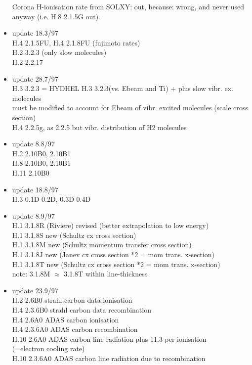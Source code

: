 \documentclass[12pt]{article}
\begin{document}
\begin{itemize}
   Corona H-ionisation rate from SOLXY: out, because:
   wrong, and never used anyway
(i.e. H.8 2.1.5G out).
 \item update   18.3/97 \\
  H.4 2.1.5FU, H.4 2.1.8FU (fujimoto rates) \\
  H.2 3.2.3  (only slow molecules) \\
  H.2 2.2.17
 \item update   28.7/97 \\
  H.3 3.2.3  = HYDHEL H.3 3.2.3(vs. Ebeam and Ti) + plus
  slow vibr. ex. molecules\\
  must be modified to account for Ebeam of vibr. excited
  molecules (scale cross section)\\
  H.4 2.2.5g, as 2.2.5 but vibr. distribution of H2 molecules
 \item update    8.8/97 \\
  H.2 2.10B0, 2.10B1 \\
  H.8 2.10B0, 2.10B1 \\
  H.11 2.10B0
 \item update   18.8/97 \\
  H.3 0.1D  0.2D, 0.3D 0.4D \\
 \item update    8.9/97 \\
  H.1 3.1.8R (Riviere) revised (better extrapolation to low energy) \\
  H.1 3.1.8S new (Schultz cx cross section) \\
  H.1 3.1.8M new (Schultz momentum transfer cross section) \\
  H.1 3.1.8J new (Janev cx cross section *2 = mom trans. x-section)\\
  H.1 3.1.8T new (Schultz cx cross section *2 = mom trans. x-section)\\
  note: 3.1.8M $\approx$ 3.1.8T within line-thickness
 \item update   23.9/97 \\
  H.2 2.6B0 strahl carbon data ionisation\\
  H.4 2.3.6B0 strahl carbon data recombination \\
  H.4 2.6A0 ADAS  carbon ionisation    \\
  H.4 2.3.6A0 ADAS  carbon recombination \\
  H.10 2.6A0 ADAS  carbon line radiation plus 11.3 per ionisation\\
                   (=electron cooling rate)\\
  H.10 2.3.6A0 ADAS  carbon line radiation due to recombination\\

\end{itemize}
\end{document}
